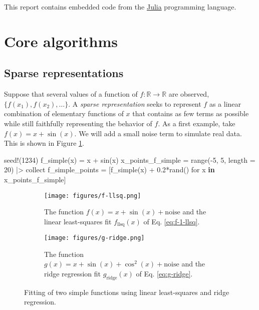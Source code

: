 \documentclass[
]{article}
\newenvironment{Shaded}{\begin{snugshade}}{\end{snugshade}}
\newcommand{\FloatTok}[1]{\textcolor[rgb]{0.68,0.00,0.00}{#1}}
\newcommand{\FunctionTok}[1]{\textcolor[rgb]{0.28,0.35,0.67}{#1}}
\newcommand{\KeywordTok}[1]{\textcolor[rgb]{0.00,0.23,0.31}{\textbf{#1}}}
\newcommand{\NormalTok}[1]{\textcolor[rgb]{0.00,0.23,0.31}{#1}}
\newcommand{\OperatorTok}[1]{\textcolor[rgb]{0.37,0.37,0.37}{#1}}
\begin{document}
This report contains embedded code from the
\href{https://julialang.org/}{Julia} programming language.

\section{Core algorithms}\label{core-algorithms}

\subsection{Sparse representations}\label{sparse-representations}

Suppose that several values of a function of
\(f : \mathbb{R} \to \mathbb{R}\) are observed,
\(\{f(x_1), f(x_2), \dots \}\). A \emph{sparse representation} seeks to
represent \(f\) as a linear combination of elementary functions of \(x\)
that contains as few terms as possible while still faithfully
representing the behavior of \(f\). As a first example, take
\(f(x) = x + \sin(x)\). We will add a small noise term to simulate real
data. This is shown in Figure \ref{fig:f-llsq}.

\begin{Shaded}
\begin{Highlighting}[]
\FunctionTok{seed!}\NormalTok{(}\FloatTok{1234}\NormalTok{)}
\FunctionTok{f\_simple}\NormalTok{(x) }\OperatorTok{=}\NormalTok{ x }\OperatorTok{+} \FunctionTok{sin}\NormalTok{(x)}
\NormalTok{x\_points\_f\_simple }\OperatorTok{=} \FunctionTok{range}\NormalTok{(}\OperatorTok{{-}}\FloatTok{5}\NormalTok{, }\FloatTok{5}\NormalTok{, length }\OperatorTok{=} \FloatTok{20}\NormalTok{) }\OperatorTok{|\textgreater{}}\NormalTok{ collect}
\NormalTok{f\_simple\_points }\OperatorTok{=}\NormalTok{ [}\FunctionTok{f\_simple}\NormalTok{(x) }\OperatorTok{+} \FloatTok{0.2}\FunctionTok{*rand}\NormalTok{() for x }\KeywordTok{in}\NormalTok{ x\_points\_f\_simple]}
\end{Highlighting}
\end{Shaded}

\begin{figure}
\centering
\begin{subfigure}{0.49\textwidth}
    \texttt{[image: figures/f-llsq.png]}
    \caption{The function $f(x) = x + \sin(x) + \text{noise}$ and the linear least-squares fit $f_\text{llsq}(x)$ of Eq. \eqref{eq:f-1-llsq}.}
    \label{fig:f-llsq}
\end{subfigure}
\hfill
\begin{subfigure}{0.49\textwidth}
    \texttt{[image: figures/g-ridge.png]}
    \caption{The function $g(x) = x + \sin(x) + \cos^2(x) + \text{noise}$ and the ridge regression fit $g_\text{ridge}(x)$ of Eq. \eqref{eq:g-ridge}.}
    \label{fig:g-ridge}
\end{subfigure}
        
\caption{Fitting of two simple functions using linear least-squares and ridge regression.}
\label{fig:sparse-motivation}
\end{figure}
\end{document}

